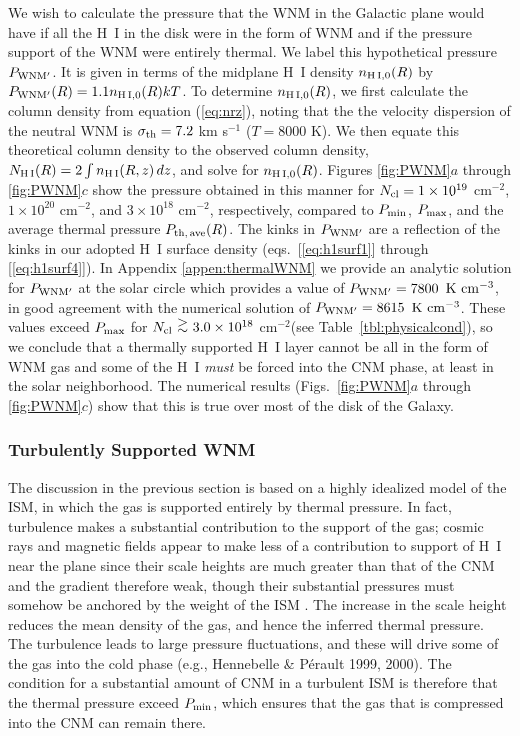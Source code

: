 \documentclass[12pt,preprint,flushrt]{aastex}
\newcommand{\ee}{$^{-2}$}
\newcommand{\pmin}{P_{\rm min}}
\newcommand{\pthave}{P_{\rm th,\,ave}}
\newcommand{\ag}{\mbox{ \raisebox{-.4ex}{$\stackrel{\textstyle >}{\sim}$} }}
\begin{document}
We wish to calculate the pressure that the WNM in
the Galactic plane would have if all the H~I in the disk were in
the form of WNM and if the pressure support of the WNM were entirely
thermal. We label this hypothetical pressure $P_{\rm WNM'}$.
It is given in terms of the midplane H~I density $n_{\rm H\,I,0}(R)$ by
$P_{\rm WNM'}(R)=1.1n_{\rm H\,I,0}(R)kT$.
To determine $n_{\rm H\,I,0}(R)$, we first calculate the
column density from equation
(\ref{eq:nrz}), noting that the
the velocity dispersion of the neutral WNM is
$\sigma_{\rm th} = 7.2$ km s$^{-1}$ ($T=8000$ K).
We then equate this theoretical column density
to the observed column density,
$N_{\rm H\,I}(R)=2\int n_{\rm H\,I}(R,z)\, dz$,
and solve for $n_{\rm H\,I,0}(R)$.
Figures \ref{fig:PWNM}$a$ through \ref{fig:PWNM}$c$  show the pressure
obtained in this manner
for $N_{\rm cl} = 1\times 10^{19}$ cm$^{-2}$,
$1\times 10^{20}$ cm$^{-2}$, and $3\times 10^{18}$ cm$^{-2}$,
respectively, compared to
$P_{\rm min}$, $P_{\rm max}$, and the average
thermal pressure $\pthave (R)$.
The kinks in $P_{\rm WNM'}$ are a reflection of the kinks
in our adopted H~I surface density (eqs.~[\ref{eq:h1surf1}]
through [\ref{eq:h1surf4}]). In Appendix \ref{appen:thermalWNM}
we provide an analytic solution for  $P_{\rm WNM'}$ at the solar 
circle which provides a value of $P_{\rm WNM'} = 7800$ ${\rm K\ cm^{-3}}$,
in good agreement with the numerical solution of 
$P_{\rm WNM'} = 8615$ ${\rm K\ cm^{-3}}$. 
These values exceed $P_{\rm max}$ for $N_{\rm cl}\ag 3.0\times 10^{18}$
cm\ee (see Table~\ref{tbl:physicalcond}), 
so we conclude that a thermally supported H~I layer cannot be
all in the form of WNM gas and some of the H~I {\em must} be forced into
the CNM phase, at least in the solar neighborhood.
The numerical results (Figs.\
\ref{fig:PWNM}$a$ through \ref{fig:PWNM}$c$)
show that this is true over most of the disk
of the Galaxy.

\subsubsection{Turbulently Supported WNM}\label{subsub:turbsupwnm}

The discussion in  the previous section is based on a highly idealized 
model of the
ISM, in which the gas is supported entirely by thermal pressure.
In fact, turbulence makes a substantial contribution to the
support of the gas; cosmic rays and magnetic fields appear to make less
of a contribution to support of H~I near the plane since 
their scale heights are much greater than
that of the CNM and the gradient therefore weak, though
their substantial pressures must somehow be anchored by the weight
of the ISM \citep{bou90}.  The increase in the scale height
reduces the mean density of the gas, and hence the inferred
thermal pressure.
The turbulence leads to large pressure fluctuations, and these
will drive some of the
gas into the cold phase (e.g., Hennebelle \& P\'erault
1999, 2000).  The condition for a
substantial amount of CNM in a turbulent ISM is therefore
that the thermal pressure exceed $\pmin$, which ensures that the gas that
is compressed into the CNM can remain there.  
\end{document}
